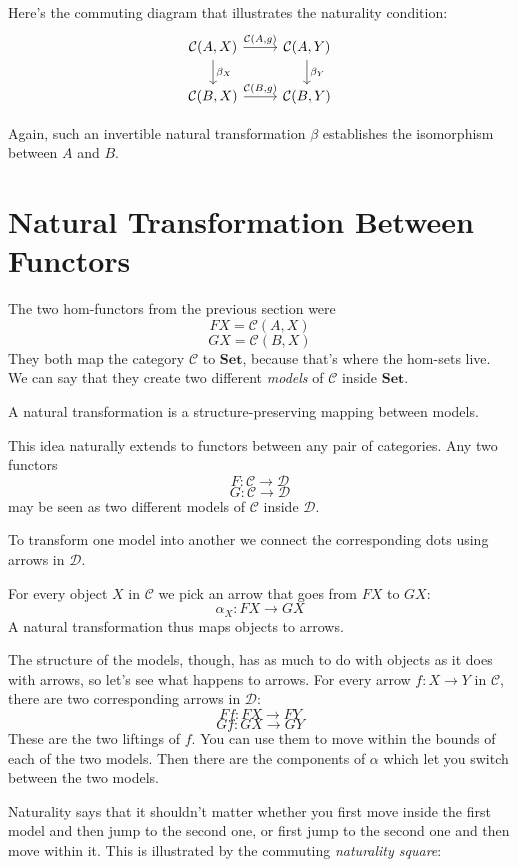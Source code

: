 \documentclass[DaoFP]{subfiles}
\begin{document}
Here's the commuting diagram that illustrates the naturality condition:
\[
 \begin{tikzcd}
 \mathcal{C}(A, X)
 \arrow[d, "\beta_X"]
 \arrow[r, "{\mathcal{C}(A, g)}"]
 &
 \mathcal{C}(A, Y)
  \arrow[d, "\beta_Y"]
 \\
 \mathcal{C}(B, X)
 \arrow[r, "{\mathcal{C}(B, g)}"]
& \mathcal{C}(B, Y)
 \end{tikzcd}
\]

Again, such an invertible natural transformation $\beta$ establishes the isomorphism between $A$ and $B$.

\section{Natural Transformation Between Functors}

The two hom-functors from the previous section were
\[ F X =   \mathcal{C}(A, X)\]
\[ G X =   \mathcal{C}(B, X)\]
They both map the category $\mathcal{C}$ to  $\mathbf{Set}$, because that's where the hom-sets live. We can say that they create two different \emph{models} of $\mathcal{C}$ inside $\mathbf{Set}$. 

A natural transformation is a structure-preserving mapping between models. 

This idea naturally extends to functors between any pair of categories. Any two functors
\[ F \colon \mathcal{C} \to \mathcal{D} \]
\[ G \colon \mathcal{C} \to \mathcal{D} \]
may be seen as two different models of $\mathcal{C}$ inside $\mathcal{D}$. 

To transform one model into another we connect the corresponding dots using arrows in $\mathcal{D}$. 

For every object $X$ in $\mathcal{C}$ we pick an arrow that goes from $F X$ to $G X$:
\[ \alpha_X \colon F X \to G X \]
A natural transformation thus maps objects to arrows.

The structure of the models, though, has as much to do with objects as it does with arrows, so let's see what happens to arrows. For every arrow $f \colon X \to Y$ in $\mathcal{C}$, there are two corresponding arrows in $\mathcal{D}$:
\[ F f \colon F X \to F Y\]
\[ G f \colon G X \to G Y \]
These are the two liftings of $f$. You can use them to move within the bounds of each of the two models. Then there are the components of $\alpha$ which let you switch between the two models. 

Naturality says that it shouldn't matter whether you first move inside the first model and then jump to the second one, or first jump to the second one and then move within it. This is illustrated by the commuting \emph{naturality square}:
\end{document}

